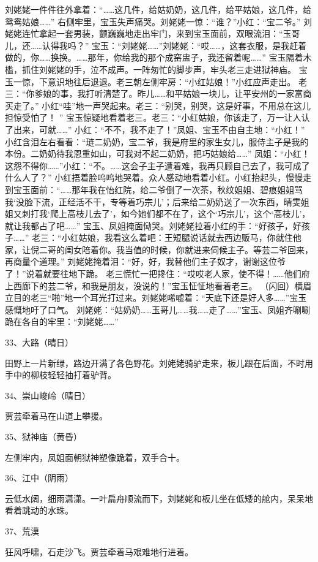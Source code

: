刘姥姥一件件往外拿着：“……这几件，给姑奶奶，这几件，给平姑娘，这几件，给鸳鸯姑娘……”
右侧牢里，宝玉失声痛哭。刘姥姥一惊：“谁？”小红：“宝二爷。”
刘姥姥连忙拿起一套男装，颤巍巍地走出牢门，来到宝玉面前，双眼流泪：“玉哥儿，还……认得我吗？”
宝玉：“刘姥姥……”刘姥姥：“哎……，这套衣服，是我赶着做的，你……换换。……那年，你给我的那个成窑盅子，我还留着呢……”
宝玉隔着木槛，抓住刘姥姥的手，泣不成声。一阵匆忙的脚步声，牢头老三走进狱神庙。
宝玉一惊，下意识地往后退退。老三朝左侧牢房：“小红姑娘！”小红应声走出。
老三：“你爹娘的事，我打听清楚了。昨儿……和平姑娘一块儿，让平安州的一家富商买走了。”
小红“哇”地一声哭起来。老三：“别哭，别哭，这是好事，不用总在这儿担惊受怕了！ ”
宝玉惊疑地看着老三。老三：“小红姑娘，你该走了，万一让人认了出来，可就……”
小红：“不不，我不走了！”凤姐、宝玉不由自主地：“小红！”
小红含泪左右看看：“琏二奶奶，宝二爷，我是府里的家生女儿，服侍主子是我的本份。二奶奶待我恩重如山，可我对不起二奶奶，把巧姑娘给……”
凤姐：“小红！这怨不得你……”小红：“不。……这会子主子遭着难，我再只顾自己去了，我可成了什么人了？”
小红捂着脸呜呜地哭着。众人感动地看着小红。小红抬起头，慢慢走到宝玉面前：“……那年我在怡红院，给二爷倒了一次茶，秋纹姐姐、碧痕姐姐骂我‘没脸下流，正经活不干，专等着巧宗儿’；后来给二奶奶送了一次东西，晴雯姐姐又刺打我‘爬上高枝儿去了’，如今她们都不在了，这个‘巧宗儿’，这个‘高枝儿’，就让我都占了吧……”
宝玉、凤姐掩面恸哭。刘姥姥拉着小红的手：“好孩子，好孩子……”
老三：“小红姑娘，我看这么着吧：王短腿说话就去西边贩马，你就住他家，让倪二哥的闺女陪着你。我当值的时候，你就进来伺候主子。等芸二爷回来，再商量个道理。”
刘姥姥掩着泪：“好，好，我替他们主子奴才，谢谢这位爷了！”说着就要往地下跪。
老三慌忙一把搀住：“哎哎老人家，使不得！……他们府上西廊下的芸二爷，和我是朋友，没说的！”宝玉怔怔地看着老三。
（闪回）横眉立目的老三“啪”地一个耳光打过来。刘姥姥唏嘘着：“天底下还是好人多……”宝玉感慨地吁了口气。
刘姥姥：“姑奶奶……玉哥儿……我……走了……”宝玉、凤姐齐唰唰跪在各自的牢里：“刘姥姥……”

33、大路（晴日）\par
田野上一片新绿，路边开满了各色野花。刘姥姥骑驴走来，板儿跟在后面，不时用手中的柳枝轻轻抽打着驴背。

34、崇山峻岭（晴日）\par
贾芸牵着马在山道上攀援。

35、狱神庙（黄昏）\par
左侧牢内，凤姐面朝狱神塑像跪着，双手合十。

36、江中（阴雨）\par
云低水阔，细雨潇潇。一叶扁舟顺流而下，刘姥姥和板儿坐在低矮的舱内，呆呆地看着跳动的水珠。

37、荒漠\par
狂风呼啸，石走沙飞。贾芸牵着马艰难地行进着。

